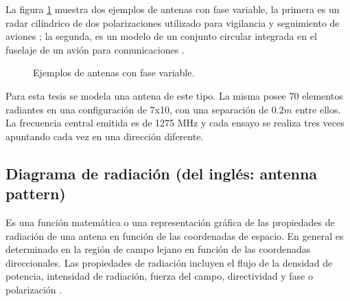 La figura \ref{fig:phasedArrayExamples} muestra dos ejemplos de antenas con fase variable, la primera es un radar cilíndrico de
dos polarizaciones utilizado para vigilancia y seguimiento de aviones \cite{Stailey2016}; la segunda, es un modelo de un conjunto
circular integrada en el fuselaje de un avión para comunicaciones \cite{Schippers2008}.
\begin{figure}[H]
	\centering
	\caption{Ejemplos de antenas con fase variable.}
	\label{fig:phasedArrayExamples}
\end{figure}

Para esta tesis se modela una antena de este tipo. La misma posee 70 elementos radiantes en una configuración de 7x10, con una
separación de $0.2m$ entre ellos. La frecuencia central emitida es de 1275 MHz y cada ensayo se realiza tres veces apuntando cada
vez en una dirección diferente. 


\subsection{Diagrama de radiación (del inglés: antenna pattern)}

Es una función matemática o una representación gráfica de las propiedades de radiación de una antena en función de las
coordenadas de espacio. En general es determinado en la región de campo lejano en función de las coordenadas direccionales.
Las propiedades de radiación incluyen el flujo de la densidad de potencia, intensidad de radiación, fuerza del campo,
directividad y fase o polarización \cite{Balanis2012}.

